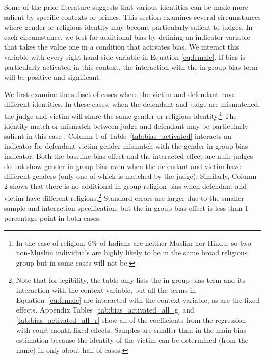 \documentclass[12pt,english]{article}
\begin{document}
Some of the prior literature suggests that various identities can be made more salient by specific contexts or primes. This section examines several circumstances where gender or religious identity may become particularly salient to judges. In each circumstance, we test for additional bias by defining an indicator variable that takes the value one in a condition that activates bias. We interact this variable with every right-hand side variable in Equation \ref{eq:female}. If bias is particularly activated in this context, the interaction with the in-group bias term will be positive and significant.

We first examine the subset of cases where the victim and defendant have different identities. In these cases, when the defendant and judge are mismatched, the judge and victim will share the same gender or religious identity.\footnote{In the case of religion, 6\% of Indians are neither Muslim nor Hindu, so two non-Muslim individuals are highly likely to be in the same broad religious group but in some cases will not be.} The identity match or mismatch between judge and defendant may be particularly salient in this case \citep{BaldusWoodworthZuckermanWeiner1997CLR,FosterLeeHorowitzKing2006BSL,BaumgartnerGriggMastro2015PGI}. Column 1 of Table~\ref{tab:bias_activated} interacts an indicator for defendant-victim gender mismatch with the gender in-group bias indicator. Both the baseline bias effect and the interacted effect are null; judges do not show gender in-group bias even when the defendant and victim have different genders (only one of which is matched by the judge). Similarly, Column 2 shows that there is no additional in-group religion bias when defendant and victim have different religions.\footnote{Note that for legibility, the table only lists the in-group bias term and its interaction with the context variable, but all the terms in Equation~\ref{eq:female} are interacted with the context variable, as are the fixed effects. Appendix Tables~\ref{tab:bias_activated_all_g} and \ref{tab:bias_activated_all_r} show all of the coefficients from the regression with court-month fixed effects. Samples are smaller than in the main bias estimation because the identity of the victim can be determined (from the name) in only about half of cases.} Standard errors are larger due to the smaller sample and interaction specification, but the in-group bias effect is less than 1 percentage point in both cases.
\end{document}
